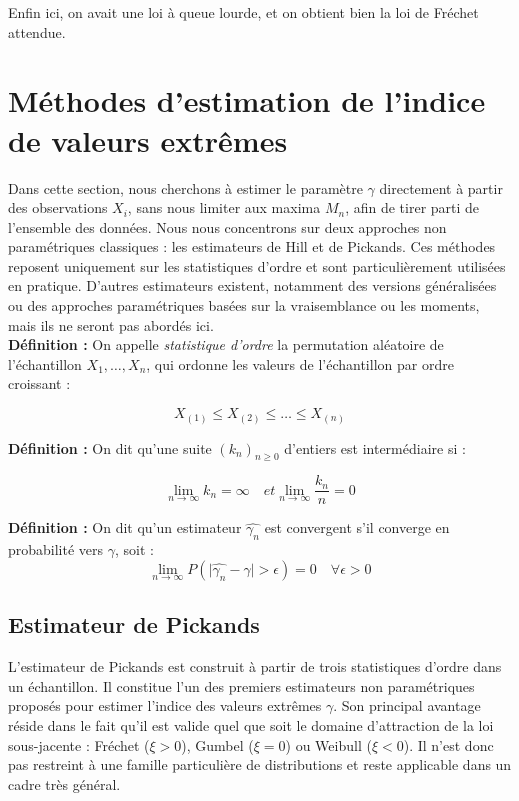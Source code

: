 \documentclass{article}
\theoremstyle{plain}
\theoremstyle{definition}
\theoremstyle{plain}
\begin{document}
\noindent Enfin ici, on avait une loi à queue lourde, et on obtient bien la loi de Fréchet attendue.

\newpage

\section{Méthodes d'estimation de l'indice de valeurs extrêmes}
Dans cette section, nous cherchons à estimer le paramètre \(\gamma\) directement à partir des observations \(X_i\), sans nous limiter aux maxima \(M_n\), afin de tirer parti de l’ensemble des données.  
Nous nous concentrons sur deux approches non paramétriques classiques : les estimateurs de Hill et de Pickands. Ces méthodes reposent uniquement sur les statistiques d’ordre et sont particulièrement utilisées en pratique. D'autres estimateurs existent, notamment des versions généralisées ou des approches paramétriques basées sur la vraisemblance ou les moments, mais ils ne seront pas abordés ici. \\

\textbf{Définition :} On appelle \textit{statistique d'ordre} la permutation aléatoire de l'échantillon \(X_1, \dots, X_n\), qui ordonne les valeurs de l’échantillon par ordre croissant :

\[
X_{(1)} \leq X_{(2)} \leq \dots \leq X_{(n)}
\]

\textbf{Définition :} On dit qu'une suite \((k_n)_{n \geq 0}\) d'entiers est intermédiaire si :

\[
\lim_{n \to \infty} k_n = \infty \quad et \lim_{n \to \infty} \frac{k_n}{n} = 0
\]

\textbf{Définition :}
On dit qu'un estimateur \(\hat{\gamma_{n}}\) est convergent s'il converge en probabilité vers \(\gamma\), soit :
\[
\lim_{n \to \infty} P(\lvert \hat{\gamma_{n}} - \gamma \rvert > \epsilon) = 0 \quad \forall \epsilon > 0
\]

\subsection{Estimateur de Pickands}

L’estimateur de Pickands est construit à partir de trois statistiques d’ordre dans un échantillon. Il constitue l’un des premiers estimateurs non paramétriques proposés pour estimer l’indice des valeurs extrêmes \(\gamma\). Son principal avantage réside dans le fait qu’il est valide quel que soit le domaine d’attraction de la loi sous-jacente : Fréchet (\(\xi > 0\)), Gumbel (\(\xi = 0\)) ou Weibull (\(\xi < 0\)). Il n'est donc pas restreint à une famille particulière de distributions et reste applicable dans un cadre très général.
\end{document}
